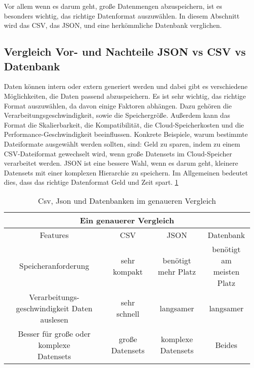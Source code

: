 Vor allem wenn es darum geht, große Datenmengen abzuspeichern, ist es besonders wichtig, das richtige Datenformat auszuwählen. In diesem Abschnitt wird das CSV, das JSON, und eine herkömmliche Datenbank verglichen. 

\subsection{Vergleich Vor- und Nachteile JSON vs CSV vs Datenbank}

Daten können intern oder extern generiert werden und dabei gibt es verschiedene Möglichkeiten, die Daten passend abzuspeichern. Es ist sehr wichtig, das richtige Format auszuwählen, da davon einige Faktoren abhängen. Dazu gehören die Verarbeitungsgeschwindigkeit, sowie die Speichergröße. 
Außerdem kann das Format die Skalierbarkeit, die Kompatibilität, die Cloud-Speicherkosten und die Performance-Geschwindigkeit beeinflussen. 
Konkrete Beispiele, warum bestimmte Dateiformate ausgewählt werden sollten, sind: Geld zu sparen, indem zu einem CSV-Dateiformat gewechselt wird, wenn große Datensets im Cloud-Speicher verarbeitet werden. JSON ist eine bessere Wahl, wenn es darum geht, kleinere Datensets mit einer komplexen Hierarchie zu speichern. 
Im Allgemeinen bedeutet dies, dass das richtige Datenformat Geld und Zeit spart. \cite{csvOrJson} \ref{tab:allgemein:csvJsonDatabase}

\begin{table}
    \centering
    \begin{tabular}{ |c|c|c|c| } 
     \hline
     \multicolumn{4}{|c|}{Ein genauerer Vergleich  } \\
     \hline
     \hline
     Features & CSV & JSON & Datenbank \\ 
     \hline 
     \hline
     Speicheranforderung & sehr kompakt & benötigt mehr Platz & \parbox[t][1cm]{3.5cm }{benötigt am \\ meisten Platz} \\ 
     \hline
     \parbox[t][1.5cm]{3.5cm }{Verarbeitungs-geschwindigkeit Daten auslesen} & sehr schnell & langsamer & langsamer \\ 
     \hline
     \parbox[t][1.5cm]{3.5cm }{Besser für große oder komplexe \\ Datensets}  & große Datensets & komplexe Datensets & Beides \\ 
     \hline
    \end{tabular} 
    \caption{Csv, Json und Datenbanken im genaueren Vergleich \cite{csvOrJson}}
    
    \label{tab:allgemein:csvJsonDatabase}
\end{table}

